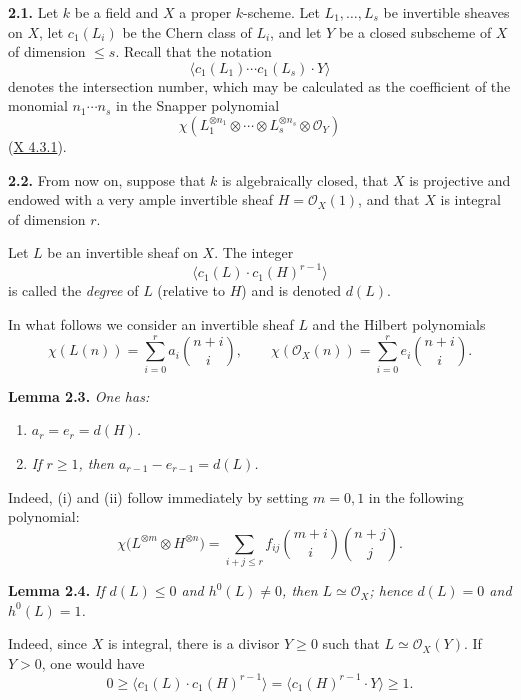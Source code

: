 \textbf{2.1.} Let \(k\) be a field and \(X\) a proper \(k\)-scheme. Let
\(L_1,\ldots,L_s\) be invertible sheaves on \(X\), let \(c_1(L_i)\) be the
Chern class of \(L_i\), and let \(Y\) be a closed subscheme of \(X\) of
dimension \(\le s\). Recall that the notation
\[
\bigl\langle c_1(L_1)\cdots c_1(L_s)\cdot Y\bigr\rangle
\]
denotes the intersection number, which may be calculated as the
coefficient of the monomial \(n_1\cdots n_s\) in the Snapper polynomial
\[
\chi\!\left(
L_1^{\otimes n_1}\otimes\cdots\otimes L_s^{\otimes n_s}
\otimes\mathcal O_Y
\right)
\]
(\hyperlink{sga6.e10.prop.4-3-1}{X 4.3.1}).

\textbf{2.2.} From now on, suppose that \(k\) is algebraically closed,
that \(X\) is projective and endowed with a very ample invertible sheaf
\(H=\mathcal O_X(1)\), and that \(X\) is integral of dimension \(r\).

Let \(L\) be an invertible sheaf on \(X\). The integer
\[
\bigl\langle c_1(L)\cdot c_1(H)^{r-1}\bigr\rangle
\]
is called the \emph{degree} of \(L\) (relative to \(H\)) and is denoted
\(d(L)\).

In what follows we consider an invertible sheaf \(L\) and the Hilbert
polynomials
\[
\chi(L(n))=\sum_{i=0}^{r}a_i\binom{n+i}{i},
\qquad
\chi(\mathcal O_X(n))=\sum_{i=0}^{r}e_i\binom{n+i}{i}.
\]

\textbf{Lemma 2.3.} \emph{One has:}
\begin{enumerate}[label=(\roman*)]
\item \emph{\(a_r=e_r=d(H)\).}
\item \emph{If \(r\ge1\), then \(a_{r-1}-e_{r-1}=d(L)\).}
\end{enumerate}

Indeed, (i) and (ii) follow immediately by setting \(m=0,1\) in the
following polynomial:
\[
\chi\bigl(L^{\otimes m}\otimes H^{\otimes n}\bigr)
=\sum_{i+j\le r}f_{ij}
\binom{m+i}{i}\binom{n+j}{j}.
\]

\textbf{Lemma 2.4.} \emph{If \(d(L)\le0\) and \(h^0(L)\ne0\), then
\(L\simeq\mathcal O_X\); hence \(d(L)=0\) and \(h^0(L)=1\).}

Indeed, since \(X\) is integral, there is a divisor \(Y\ge0\) such that
\(L\simeq\mathcal O_X(Y)\). If \(Y>0\), one would have
\[
0\ge
\bigl\langle c_1(L)\cdot c_1(H)^{r-1}\bigr\rangle
=\bigl\langle c_1(H)^{r-1}\cdot Y\bigr\rangle
\ge1.
\]

